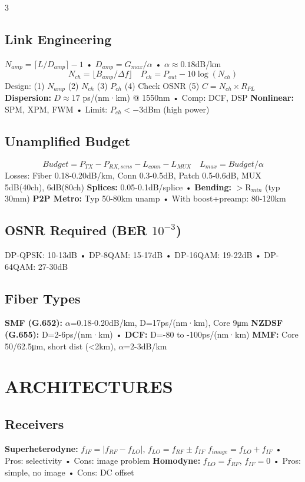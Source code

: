 \documentclass[a4paper,6pt]{extarticle}
\begin{document}
\begin{multicols}{3}
\subsection*{Link Engineering}
$N_{amp} = \lceil L/D_{amp}\rceil - 1$ • $D_{amp} = G_{max}/\alpha$ • $\alpha \approx 0.18$dB/km
$$N_{ch} = \lfloor B_{amp}/\Delta f\rfloor \quad P_{ch} = P_{out} - 10\log(N_{ch})$$
Design: (1) $N_{amp}$ (2) $N_{ch}$ (3) $P_{ch}$ (4) Check OSNR (5) $C = N_{ch} \times R_{PL}$
\textbf{Dispersion:} $D \approx 17$ ps/(nm·km) @ 1550nm • Comp: DCF, DSP
\textbf{Nonlinear:} SPM, XPM, FWM • Limit: $P_{ch} < -3$dBm (high power)

\subsection*{Unamplified Budget}
$$Budget = P_{TX} - P_{RX,sens} - L_{conn} - L_{MUX} \quad L_{max} = Budget/\alpha$$
Losses: Fiber 0.18-0.20dB/km, Conn 0.3-0.5dB, Patch 0.5-0.6dB, MUX 5dB(40ch), 6dB(80ch)
\textbf{Splices:} 0.05-0.1dB/splice • \textbf{Bending:} $>$R$_{min}$ (typ 30mm)
\textbf{P2P Metro:} Typ 50-80km unamp • With boost+preamp: 80-120km

\subsection*{OSNR Required (BER $10^{-3}$)}
DP-QPSK: 10-13dB • DP-8QAM: 15-17dB • DP-16QAM: 19-22dB • DP-64QAM: 27-30dB

\subsection*{Fiber Types}
\textbf{SMF (G.652):} $\alpha$=0.18-0.20dB/km, D=17ps/(nm·km), Core 9μm
\textbf{NZDSF (G.655):} D=2-6ps/(nm·km) • \textbf{DCF:} D=-80 to -100ps/(nm·km)
\textbf{MMF:} Core 50/62.5μm, short dist (<2km), $\alpha$=2-3dB/km

\section*{ARCHITECTURES}

\subsection*{Receivers}
\textbf{Superheterodyne:} $f_{IF} = |f_{RF} - f_{LO}|$, $f_{LO} = f_{RF} \pm f_{IF}$
$f_{image} = f_{LO} + f_{IF}$ • Pros: selectivity • Cons: image problem
\textbf{Homodyne:} $f_{LO} = f_{RF}$, $f_{IF} = 0$ • Pros: simple, no image • Cons: DC offset


\end{multicols}
\end{document}
